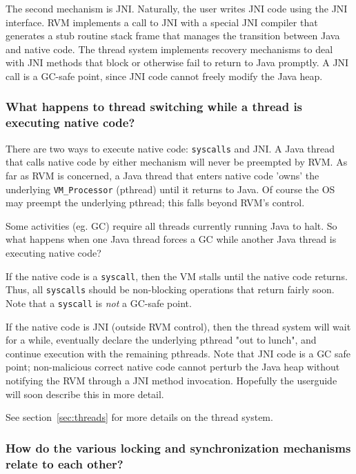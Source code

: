 The second mechanism is JNI.  Naturally, the user writes JNI code 
using the JNI interface.  RVM implements a call to JNI with a special JNI
compiler that generates a stub routine stack frame that manages the
transition between Java and native code.  The thread system implements 
recovery mechanisms to deal with JNI methods that block or otherwise fail
to return to Java promptly.  A JNI call is a GC-safe point, since JNI code
cannot freely modify the Java heap.

\subsubsection{What happens to thread switching while a thread is
executing native code?}

There are two ways to execute native code: {\tt syscalls} and JNI.
A Java thread that calls native code by either mechanism will never
be preempted by RVM.  As far as RVM is concerned, a Java thread that
enters native code 'owns' the underlying {\tt VM\_Processor} (pthread)
until it returns to Java.  Of course the OS may preempt the underlying
pthread; this falls beyond RVM's control.

Some activities (eg. GC) require all threads currently running Java to halt.  
So what happens when one Java thread forces a GC while another Java thread is
executing native code?

If the native code is a {\tt syscall}, then the VM stalls until the native
code returns.  Thus, all {\tt syscalls} should be non-blocking
operations that return fairly soon.  Note that a {\tt syscall} is 
{\em not} a GC-safe point.

If the native code is JNI (outside RVM control), then the thread system
will wait for a while, eventually declare the underlying pthread "out to
lunch", and continue execution with the remaining pthreads.  Note that 
JNI code is a GC safe point; non-malicious correct native code cannot
perturb the Java heap without notifying the RVM through a JNI method
invocation.  Hopefully the userguide will soon describe this in more
detail.

See section~\ref{sec:threads} for more details on the thread system.

\subsubsection{How do the various locking and synchronization mechanisms
relate to each other?}

